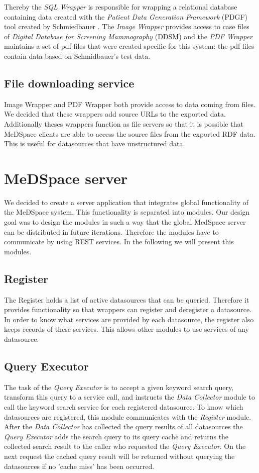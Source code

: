Thereby the \emph{SQL Wrapper} is responsible for wrapping a relational database containing data created with the \emph{Patient Data Generation Framework} (PDGF) tool created by Schmiedbauer \cite{SchmidbauerBachelorThesis}. The \emph{Image Wrapper} provides access to case files of \emph{Digital Database for Screening Mammography} (DDSM)\cite{DDSM} and the \emph{PDF Wrapper} maintains a set of pdf files that were created specific for this system: the pdf files contain data based on Schmidbauer's test data.

\subsection{File downloading service}

Image Wrapper and PDF Wrapper both provide access to data coming from files. We decided that these wrappers add source URLs to the exported data. Additionally theses wrappers function as file servers so that it is possible that MeDSpace clients are able to access the source files from the exported RDF data. This is useful for datasources that have unstructured data. 


\section{MeDSpace server}

We decided to create a server application that integrates global functionality of the MeDSpace system. This functionality is separated into modules. Our design goal was to design the modules in such a way that the global MedSpace server can be distributed in future iterations. 
Therefore the modules have to communicate by using REST services.
In the following we will present this modules.

\subsection{Register}
The Register holds a list of active datasources that can be queried. Therefore it provides functionality so that wrappers can register and deregister a datasource. In order to know what services are provided by each datasource, the register also keeps records of these services. This allows other modules to use services of any datasource.
\subsection{Query Executor}
The task of the \emph{Query Executor} is to accept a given keyword search query, transform this query to a service call, and instructs the \emph{Data Collector} module to call the keyword search service for each registered datasource. To know which datasources are registered, this module communicates with the \emph{Register} module. After the \emph{Data Collector} has collected the query results of all datasources the \emph{Query Executor} adds the search query to its query cache and returns the collected search result to the caller who requested the \emph{Query Executor}. On the next request the cached query result will be returned without querying the datasources if no 'cache miss' has been occurred.


